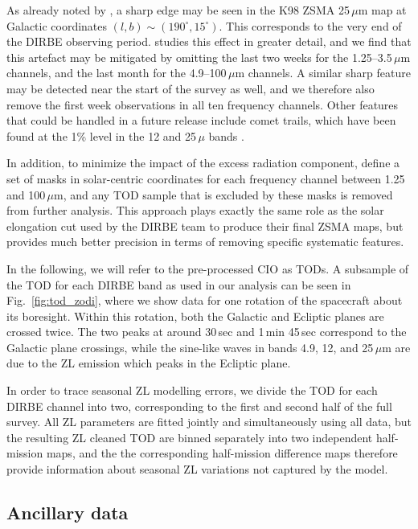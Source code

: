 \documentclass[twocolumn]{aa}
\begin{document}
As already noted by \citet{Kelsall1998}, a sharp edge may be seen in
the K98 ZSMA 25\,$\mu$m map at Galactic coordinates
$(l,b)\sim(190^{\circ},15^{\circ})$. This corresponds to the very end
of the DIRBE observing period. \citet{CG02_01} studies this effect in
greater detail, and we find that this artefact may be mitigated by
omitting the last two weeks for the 1.25--3.5\,$\mu$m channels, and
the last month for the 4.9--100$\,\mu$m channels. A similar sharp
feature may be detected near the start of the survey as well, and we
therefore also remove the first week observations in all ten frequency
channels. Other features that could be handled in a future release
include comet trails, which have been found at the 1\% level in the 12
and 25\,$\mu$ bands \citep{arendt}.




In addition, to minimize the impact of the excess radiation component,
\citet{CG02_01} define a set of masks in solar-centric coordinates for
each frequency channel between 1.25 and 100\,$\mu$m, and any TOD
sample that is excluded by these masks is removed from further
analysis. This approach plays exactly the same role as the solar
elongation cut used by the DIRBE team to produce their final ZSMA
maps, but provides much better precision in terms of removing specific
systematic features.

In the following, we will refer to the pre-processed CIO as TODs.  A
subsample of the TOD for each DIRBE band as used in our analysis can
be seen in Fig.~\ref{fig:tod_zodi}, where we show data for one
rotation of the spacecraft about its boresight. Within this rotation,
both the Galactic and Ecliptic planes are crossed twice. The two peaks
at around 30\,sec and 1\,min 45\,sec correspond to the Galactic plane
crossings, while the sine-like waves in bands 4.9, 12, and 25\,$\mu$m
are due to the ZL emission which peaks in the Ecliptic plane.

In order to trace seasonal ZL modelling errors, we divide the TOD for
each DIRBE channel into two, corresponding to the first and second
half of the full survey. All ZL parameters are fitted jointly and
simultaneously using all data, but the resulting ZL cleaned TOD are
binned separately into two independent half-mission maps, and the the
corresponding half-mission difference maps therefore provide
information about seasonal ZL variations not captured by the model.

\subsection{Ancillary data}
\end{document}
